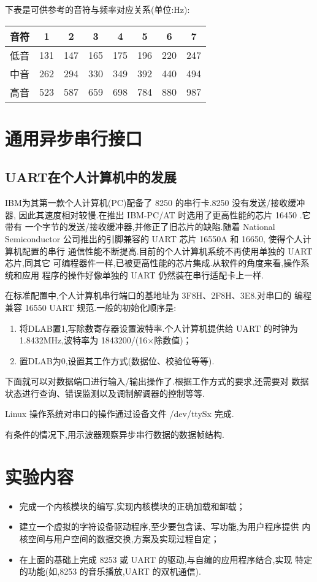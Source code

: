     下表是可供参考的音符与频率对应关系(单位:Hz):
\begin{table}[!h]
\centering\large
\begin{tabular}{|*8{|c}||} \hline
   音符 &  1  &  2  &  3  &  4  &  5  &  6  &  7\\\hline
   低音 & 131 & 147 & 165 & 175 & 196 & 220 & 247\\
   中音 & 262 & 294 & 330 & 349 & 392 & 440 & 494\\
   高音 & 523 & 587 & 659 & 698 & 784 & 880 & 987\\\hline
\end{tabular}
\end{table}

\section{通用异步串行接口}
\subsection{UART在个人计算机中的发展}
	IBM为其第一款个人计算机(PC)配备了 8250 的串行卡.8250 没有发送/接收缓冲器,
因此其速度相对较慢.在推出 IBM-PC/AT 时选用了更高性能的芯片 16450 .它带有
一个字节的发送/接收缓冲器,并修正了旧芯片的缺陷.随着 National Semiconductor
公司推出的引脚兼容的 UART 芯片 16550A 和 16650, 使得个人计算机配置的串行
通信性能不断提高.目前的个人计算机系统不再使用单独的 UART 芯片,同其它
可编程器件一样,已被更高性能的芯片集成.从软件的角度来看,操作系统和应用
程序的操作好像单独的 UART 仍然装在串行适配卡上一样.

	在标准配置中,个人计算机串行端口的基地址为 3F8H、2F8H、3E8.对串口的
编程兼容 16550 UART 规范.一般的初始化顺序是:
\begin{enumerate}\itemsep=-3pt
  \item 将DLAB置1,写除数寄存器设置波特率.个人计算机提供给 UART 的时钟为
        1.8432MHz,波特率为 1843200/(16$\times$除数值)；
  \item 置DLAB为0,设置其工作方式(数据位、校验位等等).
\end{enumerate}

    下面就可以对数据端口进行输入/输出操作了.根据工作方式的要求,还需要对
数据状态进行查询、错误监测以及调制解调器的控制等等.

    Linux 操作系统对串口的操作通过设备文件 /dev/ttySx 完成.

    有条件的情况下,用示波器观察异步串行数据的数据帧结构.
\section{实验内容}
\begin{itemize}\itemsep=-3pt
  \item 完成一个内核模块的编写,实现内核模块的正确加载和卸载；
  \item 建立一个虚拟的字符设备驱动程序,至少要包含读、写功能,为用户程序提供
        内核空间与用户空间的数据交换,方案及实现过程自定；
  \item 在上面的基础上完成 8253 或 UART 的驱动,与自编的应用程序结合,实现
		特定的功能(如,8253 的音乐播放,UART 的双机通信).
\end{itemize}

